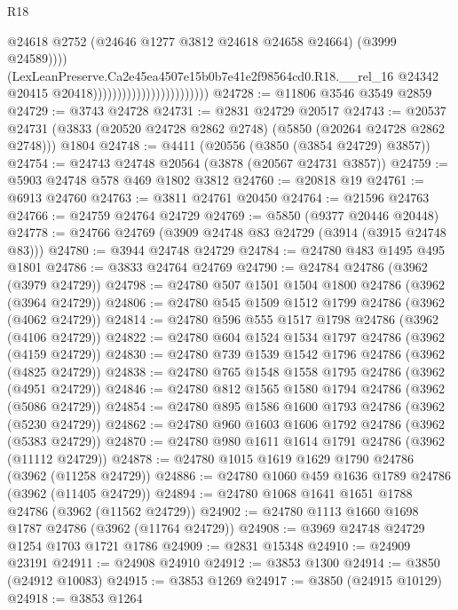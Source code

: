 \begin{lexlean}{R18}
\begin{coremodule}
                                                        @24618
                                                        @2752
                                                        (@24646 @1277 @3812 @24618 @24658 @24664)
                                                        (@3999 @24589))))
                                                  (LexLeanPreserve.Ca2e45ea4507e15b0b7e41e2f98564cd0.R18.__rel_16
                                                    @24342
                                                    @20415
                                                    @20418))))))))))))))))))))))))
@24728 := @11806 @3546 @3549 @2859
@24729 := @3743 @24728
@24731 := @2831 @24729 @20517
@24743 := @20537
    @24731
    (@3833 (@20520 @24728 @2862 @2748) (@5850 (@20264 @24728 @2862 @2748)))
    @1804
@24748 := @4411 (@20556 (@3850 (@3854 @24729) @3857))
@24754 := @24743 @24748 @20564 (@3878 (@20567 @24731 @3857))
@24759 := @5903 @24748 @578 @469 @1802 @3812
@24760 := @20818 @19
@24761 := @6913 @24760
@24763 := @3811 @24761 @20450
@24764 := @21596 @24763
@24766 := @24759 @24764 @24729
@24769 := @5850 (@9377 @20446 @20448)
@24778 := @24766 @24769 (@3909 @24748 @83 @24729 (@3914 (@3915 @24748 @83)))
@24780 := @3944 @24748 @24729
@24784 := @24780 @483 @1495 @495 @1801
@24786 := @3833 @24764 @24769
@24790 := @24784 @24786 (@3962 (@3979 @24729))
@24798 := @24780 @507 @1501 @1504 @1800 @24786 (@3962 (@3964 @24729))
@24806 := @24780 @545 @1509 @1512 @1799 @24786 (@3962 (@4062 @24729))
@24814 := @24780 @596 @555 @1517 @1798 @24786 (@3962 (@4106 @24729))
@24822 := @24780 @604 @1524 @1534 @1797 @24786 (@3962 (@4159 @24729))
@24830 := @24780 @739 @1539 @1542 @1796 @24786 (@3962 (@4825 @24729))
@24838 := @24780 @765 @1548 @1558 @1795 @24786 (@3962 (@4951 @24729))
@24846 := @24780 @812 @1565 @1580 @1794 @24786 (@3962 (@5086 @24729))
@24854 := @24780 @895 @1586 @1600 @1793 @24786 (@3962 (@5230 @24729))
@24862 := @24780 @960 @1603 @1606 @1792 @24786 (@3962 (@5383 @24729))
@24870 := @24780 @980 @1611 @1614 @1791 @24786 (@3962 (@11112 @24729))
@24878 := @24780 @1015 @1619 @1629 @1790 @24786 (@3962 (@11258 @24729))
@24886 := @24780 @1060 @459 @1636 @1789 @24786 (@3962 (@11405 @24729))
@24894 := @24780 @1068 @1641 @1651 @1788 @24786 (@3962 (@11562 @24729))
@24902 := @24780 @1113 @1660 @1698 @1787 @24786 (@3962 (@11764 @24729))
@24908 := @3969 @24748 @24729 @1254 @1703 @1721 @1786
@24909 := @2831 @15348
@24910 := @24909 @23191
@24911 := @24908 @24910
@24912 := @3853 @1300
@24914 := @3850 (@24912 @10083)
@24915 := @3853 @1269
@24917 := @3850 (@24915 @10129)
@24918 := @3853 @1264

\end{coremodule}
\end{lexlean}
